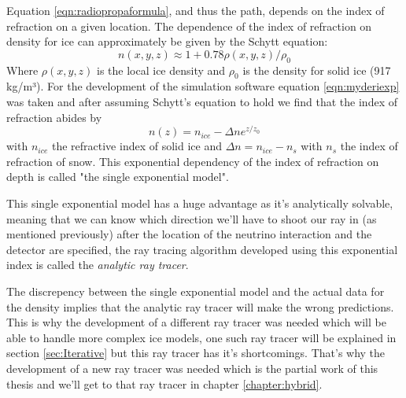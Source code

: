 \documentclass[11pt,a4paper,faculty=we,language=en,doctype=report]{cls/ugent-doc}
\begin{document}
Equation \ref{eqn:radiopropaformula}, and thus the path, depends on the index
of refraction on a given location.  The dependence of the index of refraction
on density for ice can approximately be given by the Schytt equation\cite{Barwick_2018}:
\begin{equation} 
	n(x,y,z) \approx 1 + 0.78\rho(x,y,z)/\rho_0 \label{eqn:Schytt}
\end{equation} 
Where $\rho(x,y,z)$ is the local ice density and $\rho_0$ is the
density for solid ice (917 kg/m³).  For the development of the simulation
software equation \ref{eqn:myderiexp} was taken and after assuming Schytt's
equation to hold we find that the index of refraction abides by
\begin{equation}
	\label{eqn:expn}
	n(z) = n_{ice} - \Delta n e^{z/z_0}
\end{equation}
with $n_{ice}$ the refractive index of solid ice and $\Delta n = n_{ice} - n_s$
with $n_s$ the index of refraction of snow. This exponential dependency of the
index of refraction on depth is called "the single exponential model".  

This single exponential model has a huge advantage as it's analytically
solvable, meaning that we can know which direction we'll have to shoot our ray
in (as mentioned previously) after the location of the neutrino interaction and
the detector are specified, the ray tracing algorithm developed using this
exponential index is called the \textit{analytic ray tracer}.

The discrepency between the single exponential model and the actual data for
the density implies that the analytic ray tracer will make the wrong
predictions.  This is why the development of a different ray tracer was needed
which will be able to handle more complex ice models, one such ray tracer will
be explained in section \ref{sec:Iterative} but this ray tracer has it's
shortcomings. That's why the development of a new ray tracer was needed which
is the partial work of this thesis and we'll get to that ray tracer in chapter
\ref{chapter:hybrid}.
\end{document}
